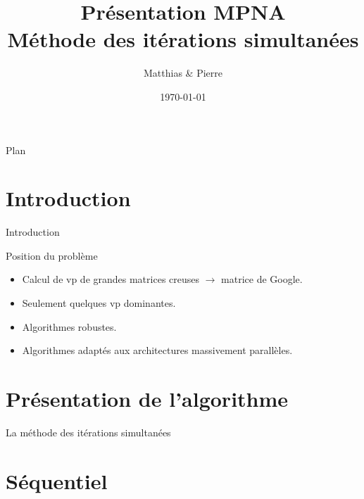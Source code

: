 \documentclass[9.5pt]{beamer}
\title[MPNA : MIS]{Présentation MPNA \\Méthode des itérations simultanées}
\author[\bsc{Beaupère} \& \bsc{Granger}]{Matthias \bsc{Beaupère} \& Pierre \bsc{Granger}}
\institute{M2 CHPS}
\date{\today}
\begin{document}

\begin{frame}
  \titlepage
\end{frame}

\begin{frame}{Plan}
	\tableofcontents[hideallsubsections]
\end{frame}

\section{Introduction}
	\begin{frame}{Introduction}
		\begin{block}{Position du problème}
			\begin{itemize}
				\item Calcul de vp de grandes matrices creuses $\rightarrow$ matrice de Google.
				\item Seulement quelques vp dominantes.
				\item Algorithmes robustes.
				\item Algorithmes adaptés aux architectures massivement parallèles.
			\end{itemize}
		\end{block}
	\end{frame}

\section{Présentation de l'algorithme}
	\begin{frame}{La méthode des itérations simultanées}

	\end{frame}

\section{Séquentiel}
\end{document}
